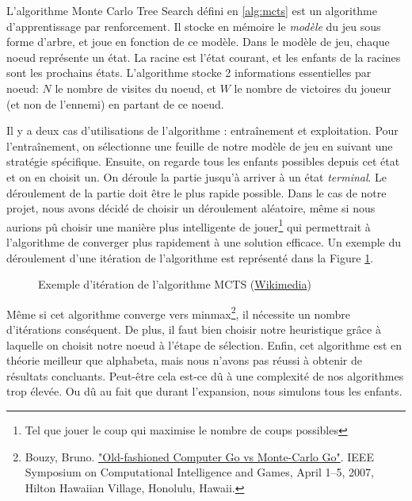 L'algorithme Monte Carlo Tree Search défini en \ref{alg:mcts} est un algorithme d'apprentissage par renforcement.
Il stocke en mémoire le \emph{modèle} du jeu sous forme d'arbre, et joue en fonction de ce modèle.
Dans le modèle de jeu, chaque noeud représente un état. La racine est l'état courant, et les enfants de la racines
sont les prochains états. L'algorithme stocke 2 informations essentielles par noeud: $N$ le nombre de visites du noeud, et $W$
le nombre de victoires du joueur (et non de l'ennemi) en partant de ce noeud.

Il y a deux cas d'utilisations de l'algorithme : entraînement et exploitation.
Pour l'entraînement, on sélectionne une feuille de notre modèle de jeu en suivant une stratégie spécifique.
Ensuite, on regarde tous les enfants possibles depuis cet état et on en choisit un. On déroule
la partie jusqu'à arriver à un état \emph{terminal}. Le déroulement de la partie doit être le plus rapide possible.
Dans le cas de notre projet, nous avons décidé de choisir un déroulement aléatoire, même si nous aurions pû choisir une manière plus intelligente de jouer\footnote{Tel que jouer le coup qui maximise le nombre de coups possibles} qui permettrait
à l'algorithme de converger plus rapidement à une solution efficace.
Un exemple du déroulement d'une itération de l'algorithme est représenté dans la Figure \ref{fig:mcts-exemple}.
\begin{figure}[H]
	\centering
	\caption{Exemple d'itération de l'algorithme MCTS (\href{https://commons.wikimedia.org/wiki/File:MCTS_(French).svg}{Wikimedia})}
	\label{fig:mcts-exemple}
\end{figure}

Même si cet algorithme converge vers minmax\footnote{Bouzy, Bruno. \href{https://ewh.ieee.org/cmte/cis/mtsc/ieeecis/tutorial2007/Bruno_Bouzy_2007.pdf}{"Old-fashioned Computer Go vs Monte-Carlo Go"}. IEEE Symposium on Computational Intelligence and Games, April 1–5, 2007, Hilton Hawaiian Village, Honolulu, Hawaii.},
il nécessite un nombre d'itérations conséquent. De plus, il faut bien choisir notre heuristique grâce à laquelle on choisit notre noeud à l'étape de sélection.
Enfin, cet algorithme est en théorie meilleur que alphabeta, mais nous n'avons pas réussi à obtenir de résultats concluants.
Peut-être cela est-ce dû à une complexité de nos algorithmes trop élevée. Ou dû au fait que durant l'expansion, nous
simulons tous les enfants. 

